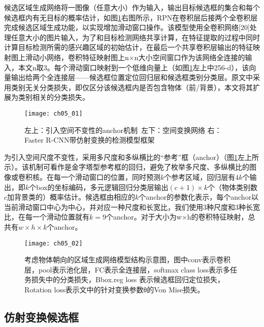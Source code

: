 候选区域生成网络将一图像（任意大小）作为输入，输出目标候选框的集合和每个候选框内有无目标的概率估计，如图\ref{fig:ch05_01}右图所示，RPN在卷积层后接两个全卷积层完成候选区域生成功能，以实现增加滑动窗口操作。该模型使用全卷积网络[20]处理任意大小的图片输入，为了和目标检测网络\citep{Girshick2015b}共享计算，在特征提取的过程中同时计算目标检测所需的感兴趣区域的初始估计，在最后一个共享卷积层输出的特征映射图上滑动小网络，卷积特征映射图上n×n大小空间窗口作为该网络全连接的输入，本文n取3。每个滑动窗口映射到一个低维向量上（如图\ref{fig:ch05_01}左上中256-d），该向量输出给两个全连接层——候选框位置定位回归层和候选框类别分类层。原文中采用类别无关分类损失，即仅区分该候选框内是否包含物体（前/背景），本文将其扩展为类别相关的分类损失。
\begin{figure}[!htbp]
\centering
\texttt{[image: ch05\_01]}
\caption{左上：引入空间不变性的anchor机制\   左下：空间变换网络  右：Faster R-CNN带仿射变换的检测模型框架}
\label{fig:ch05_01}
\end{figure}

为引入空间尺度不变性，采用多尺度和多纵横比的“参考”框（anchor）（图\ref{fig:ch05_01}左上所示）。该机制可看作是金字塔型参考框的回归，避免了枚举多尺度、多纵横比的图像或卷积核。在每一个滑动窗口的位置，同时预测$k$个参考区域，回归层有$4k$个输出，即$k$个box的坐标编码，多元逻辑回归分类层输出$(c+1)×k$个（物体类别数$c$加背景类的）概率估计。候选框由相应的$k$个anchor的参数化表示，每个anchor以当前滑动窗口中心为中心，并对应一种尺度和长宽比，我们使用3种尺度和3种长宽比，在每一个滑动位置就有$k=9$个anchor。对于大小为w×h的卷积特征映射，总共有$w×h×k$个anchor。

\begin{figure}[!htbp]
\centering
\texttt{[image: ch05\_02]}
\caption{考虑物体朝向的区域生成网络模型结构示意图，图中conv表示卷积层，pool表示池化层，FC表示全连接层，softmax class loss表示多任务损失中的分类损失，Bbox.reg loss 表示候选框回归定位损失，Rotation loss表示文中的针对变换参数θ的Von Mise损失。}
\label{fig:ch05_02}
\end{figure} 

\subsection{仿射变换候选框}
 

